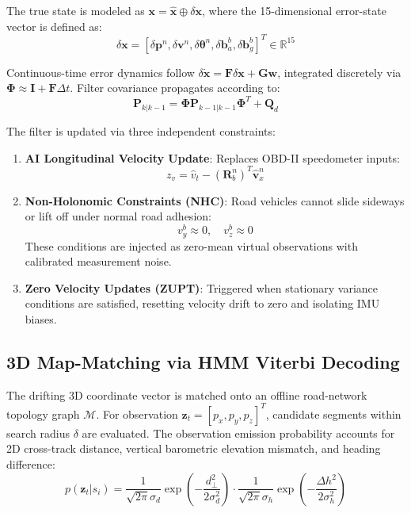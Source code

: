 \documentclass[conference]{IEEEtran}
\begin{document}
The true state is modeled as $\mathbf{x} = \hat{\mathbf{x}} \oplus \delta\mathbf{x}$, where the 15-dimensional error-state vector is defined as:
\begin{equation}
\delta\mathbf{x} = \left[\delta\mathbf{p}^n, \delta\mathbf{v}^n, \delta\boldsymbol{\theta}^n, \delta\mathbf{b}_a^b, \delta\mathbf{b}_g^b\right]^T \in \mathbb{R}^{15}
\end{equation}

Continuous-time error dynamics follow $\delta\dot{\mathbf{x}} = \mathbf{F}\delta\mathbf{x} + \mathbf{G}\mathbf{w}$, integrated discretely via $\boldsymbol{\Phi} \approx \mathbf{I} + \mathbf{F}\Delta t$. Filter covariance propagates according to:
\begin{equation}
\mathbf{P}_{k|k-1} = \boldsymbol{\Phi}\mathbf{P}_{k-1|k-1}\boldsymbol{\Phi}^T + \mathbf{Q}_d
\end{equation}

The filter is updated via three independent constraints:
\begin{enumerate}
\item \textbf{AI Longitudinal Velocity Update}: Replaces OBD-II speedometer inputs:
\begin{equation}
z_v = \hat{v}_t - (\mathbf{R}_b^n)^T \hat{\mathbf{v}}_x^n
\end{equation}
\item \textbf{Non-Holonomic Constraints (NHC)}: Road vehicles cannot slide sideways or lift off under normal road adhesion:
\begin{equation}
v_y^b \approx 0, \quad v_z^b \approx 0
\end{equation}
These conditions are injected as zero-mean virtual observations with calibrated measurement noise.
\item \textbf{Zero Velocity Updates (ZUPT)}: Triggered when stationary variance conditions are satisfied, resetting velocity drift to zero and isolating IMU biases.
\end{enumerate}

\subsection{3D Map-Matching via HMM Viterbi Decoding}

The drifting 3D coordinate vector is matched onto an offline road-network topology graph $\mathcal{M}$. For observation $\mathbf{z}_t = [p_x, p_y, p_z]^T$, candidate segments within search radius $\delta$ are evaluated. The observation emission probability accounts for 2D cross-track distance, vertical barometric elevation mismatch, and heading difference:
\begin{equation}
p(\mathbf{z}_t|s_i) = \frac{1}{\sqrt{2\pi}\sigma_d}\exp\left(-\frac{d_{\perp}^2}{2\sigma_d^2}\right) \cdot \frac{1}{\sqrt{2\pi}\sigma_h}\exp\left(-\frac{\Delta h^2}{2\sigma_h^2}\right)
\end{equation}
\end{document}
